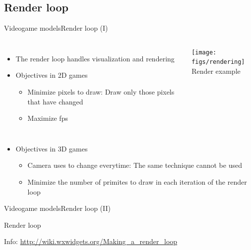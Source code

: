 \documentclass[10pt,compress]{beamer} %
\begin{document}
\subsection{Render loop}
\begin{frame}{Videogame models}{Render loop (I)}
    \begin{columns}
		\begin{itemize}
	   	\item The render loop handles visualization and rendering
	   	\item Objectives in 2D games
		\begin{itemize}
			\item Minimize pixels to draw: Draw only those pixels that have changed
			\item Maximize fps
		\end{itemize}
		\end{itemize}
	\centering\texttt{[image: figs/rendering]}\\
	Render example
 	\end{columns}
	\begin{itemize}
	\item Objectives in 3D games
		\begin{itemize}
			\item Camera uses to change everytime: The same technique cannot be used
			\item Minimize the number of primites to draw in each iteration of the render loop
		\end{itemize}
	\end{itemize}
\end{frame}

\begin{frame}{Videogame models}{Render loop (II)}
	    \vspace{-0.2cm}
    \begin{block}{Render loop}
	    \vspace{-0.2cm}
	    
		\vspace{-0.2cm}
	\end{block}
	Info: \url{http://wiki.wxwidgets.org/Making\_a\_render\_loop}
\end{frame}
\end{document}
